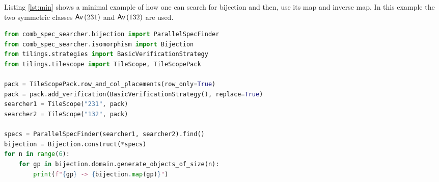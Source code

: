 \label{ch:minex}
Listing \ref{lst:min} shows a minimal example of how one can search for bijection and then, use its map and inverse map. In this example the two symmetric classes $\textsf{Av}\left(231\right)$ and $\textsf{Av}\left(132\right)$ are used.

\begin{lstlisting}[style=py,language=Python,caption={A minimal example to find a bijection.},label={lst:min}]
from comb_spec_searcher.bijection import ParallelSpecFinder
from comb_spec_searcher.isomorphism import Bijection
from tilings.strategies import BasicVerificationStrategy
from tilings.tilescope import TileScope, TileScopePack

pack = TileScopePack.row_and_col_placements(row_only=True)
pack = pack.add_verification(BasicVerificationStrategy(), replace=True)
searcher1 = TileScope("231", pack)
searcher2 = TileScope("132", pack)

specs = ParallelSpecFinder(searcher1, searcher2).find()
bijection = Bijection.construct(*specs)
for n in range(6):
    for gp in bijection.domain.generate_objects_of_size(n):
        print(f"{gp} -> {bijection.map(gp)}")
\end{lstlisting}

